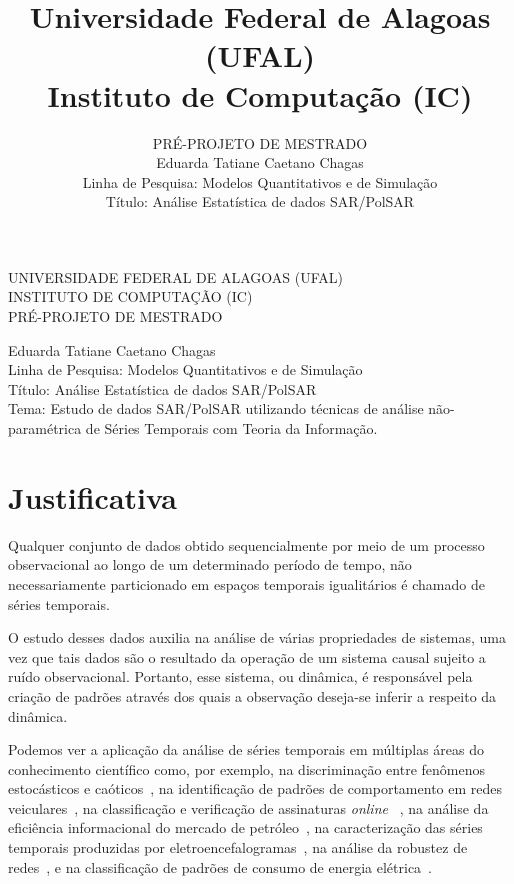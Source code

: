 \documentclass[12pt]{ctexart}
\title{Universidade Federal de Alagoas (UFAL)\\
Instituto de Computação (IC)}
\author{PRÉ-PROJETO DE MESTRADO\\
Eduarda Tatiane Caetano Chagas\\
Linha de Pesquisa: Modelos Quantitativos e de Simulação \\ 
Título: Análise Estatística de dados SAR/PolSAR}
\begin{document}
\begin{center}
\hrulefill

UNIVERSIDADE FEDERAL DE ALAGOAS (UFAL)\\
INSTITUTO DE COMPUTAÇÃO (IC)\\
PRÉ-PROJETO DE MESTRADO

\hrulefill
\end{center}


\noindent Eduarda Tatiane Caetano Chagas\\
Linha de Pesquisa: Modelos Quantitativos e de Simulação \\ 
Título: Análise Estatística de dados SAR/PolSAR\\
Tema: Estudo de dados SAR/PolSAR utilizando técnicas de análise não-paramétrica de Séries Temporais com Teoria da Informação.

\section*{Justificativa}

Qualquer conjunto de dados obtido sequencialmente por meio de um processo observacional ao longo de um determinado período de tempo, não necessariamente particionado em espaços temporais igualitários é chamado de séries temporais.

O estudo desses dados auxilia na análise de várias propriedades de sistemas, uma vez que tais dados são o resultado da operação de um sistema causal sujeito a ruído observacional. Portanto, esse sistema, ou dinâmica, é responsável pela criação de padrões através dos quais a observação deseja-se inferir a respeito da dinâmica. 

Podemos ver a aplicação da análise de séries temporais em múltiplas áreas do conhecimento científico como, por exemplo, 
na discriminação entre fenômenos estocásticos e caóticos~\cite{DistinguishingNoiseFromChaos}, 
na identificação de padrões de comportamento em redes veiculares~\cite{CharacterizationVehicleBehaviorInformationTheory}, 
na classificação e verificação de assinaturas \textit{online} ~\cite{ClassificationVerificationOnlineHandwrittenSignatures},
na análise da eficiência informacional do mercado de petróleo~\cite{oilMarket},
na caracterização das séries temporais produzidas por eletroencefalogramas~\cite{EGGTimeSeries},
na análise da robustez de redes~\cite{InformationTheoryPerspectiveNetworkRobustness}, e 
na classificação de padrões de consumo de energia elétrica~\cite{CharacterizationElectricLoadInformationTheoryQuantifiers}.
\end{document}
